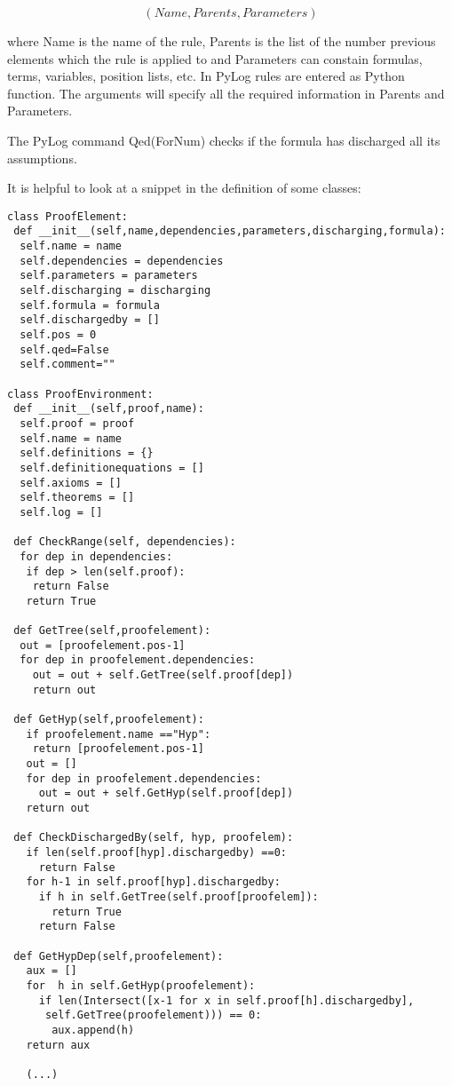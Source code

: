 \documentclass[a4paper,12pt,leqno]{article}
\numberwithin{equation}{section}
\begin{document}
\[ (Name, Parents, Parameters) \]

where Name is the name of the rule, Parents is the list of the number previous elements which the rule is applied to and Parameters can constain formulas, terms, variables, position lists, etc.
In PyLog rules are entered as  Python function. The arguments will specify all the required information in Parents and Parameters.

The PyLog command Qed(ForNum) checks if the formula has discharged all its assumptions.

It is helpful to look at a snippet in the definition of some classes:

\begin{verbatim}
class ProofElement:
 def __init__(self,name,dependencies,parameters,discharging,formula):
  self.name = name
  self.dependencies = dependencies
  self.parameters = parameters
  self.discharging = discharging
  self.formula = formula
  self.dischargedby = []
  self.pos = 0
  self.qed=False 
  self.comment=""

class ProofEnvironment:
 def __init__(self,proof,name):
  self.proof = proof
  self.name = name
  self.definitions = {}
  self.definitionequations = []
  self.axioms = []
  self.theorems = []
  self.log = []

 def CheckRange(self, dependencies):
  for dep in dependencies:
   if dep > len(self.proof):
    return False
   return True

 def GetTree(self,proofelement):
  out = [proofelement.pos-1]
  for dep in proofelement.dependencies:
    out = out + self.GetTree(self.proof[dep])
    return out

 def GetHyp(self,proofelement):
   if proofelement.name =="Hyp":
    return [proofelement.pos-1]
   out = []
   for dep in proofelement.dependencies:
     out = out + self.GetHyp(self.proof[dep])
   return out

 def CheckDischargedBy(self, hyp, proofelem):
   if len(self.proof[hyp].dischargedby) ==0:
     return False
   for h-1 in self.proof[hyp].dischargedby:
     if h in self.GetTree(self.proof[proofelem]):
       return True
     return False

 def GetHypDep(self,proofelement): 
   aux = []
   for  h in self.GetHyp(proofelement):
     if len(Intersect([x-1 for x in self.proof[h].dischargedby],
      self.GetTree(proofelement))) == 0:
       aux.append(h)
   return aux 

   (...)
\end{verbatim}	
\end{document}

